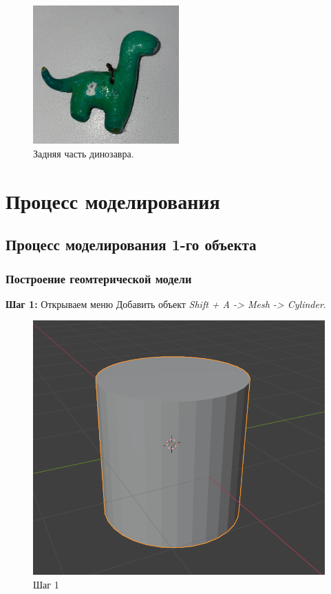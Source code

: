 \documentclass[areasetadvanced]{scrartcl}
\begin{document}
\begin{figure}[H]
    \centering
    \includegraphics[width=0.5\textwidth]{DinoBack.png}
    \caption{Задняя часть динозавра.}
    \label{fig:syntdiag}
\end{figure}

\newpage
\section{Процесс моделирования}

\subsection{Процесс моделирования 1-го объекта}
\subsubsection{Построение геомтерической модели}
\par \textbf{Шаг 1:} Открываем меню Добавить объект \textit{Shift + A -> Mesh ->  Cylinder}.
\begin{figure}[H]
    \label{4} 
    \centering
    \includegraphics[width=0.6\linewidth]{pen/1.png}
    \caption{Шаг 1}
\end{figure}
\end{document}
